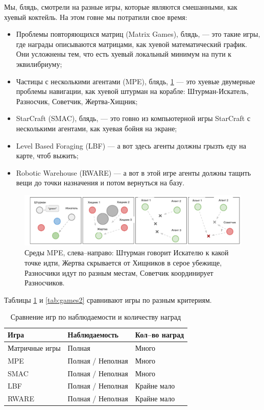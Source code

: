 Мы, блядь, смотрели на разные игры, которые являются смешанными, как хуевый коктейль. На этом говне мы потратили свое время:
\begin{itemize}[label=---]
	\item Проблемы повторяющихся матриц (Matrix Games), блядь, --- это такие игры, где награды описываются матрицами, как хуевой математический график. Они усложнены тем, что есть хуевый локальный минимум на пути к эквилибриуму;
	\item Частицы с несколькими агентами (MPE), блядь, \ref{fig:mpe} --- это хуевые двумерные проблемы навигации, как хуевой штурман на корабле: Штурман-Искатель, Разносчик, Советчик, Жертва-Хищник;
	\item StarCraft (SMAC), блядь, --- это говно из компьютерной игры StarCraft с несколькими агентами, как хуевая бойня на экране;
	\item Level Based Foraging (LBF) --- а вот здесь агенты должны грызть еду на карте, чтоб выжить;
	\item Robotic Warehouse (RWARE) --- а вот в этой игре агенты должны тащить вещи до точки назначения и потом вернуться на базу.
\end{itemize}

\begin{figure}[H]
	\begin{center}
		\includegraphics[pages=-, width=140mm]{./inc/img/mpe.png}
		\caption{Среды MPE, слева--направо: Штурман говорит Искателю к какой точке идти, Жертва скрывается от Хищников в серое убежище, Разносчики идут по разным местам, Советчик координирует Разносчиков.}
		\label{fig:mpe}
	\end{center}
\end{figure}

Таблицы \ref{tab:games1} и \ref{tab:games2} сравнивают игры по разным критериям.

\begin{table}[H]
	\centering
	\caption{Сравнение игр по наблюдаемости и количеству наград}
	\label{tab:games1}
	\begin{tabular}{@{}|l|l|l|@{}}
		\toprule
		Игра           & Наблюдаемость     & Кол--во наград \\ \midrule
		Матричные игры & Полная            & Много          \\
		MPE            & Полная / Неполная & Много          \\
		SMAC           & Полная / Неполная & Много          \\
		LBF            & Полная / Неполная & Крайне мало    \\
		RWARE          & Полная / Неполная & Крайне мало    \\ \bottomrule
	\end{tabular}
\end{table}

